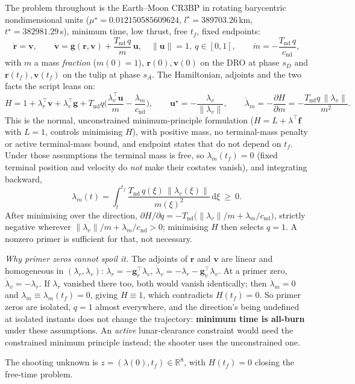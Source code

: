 \documentclass[11pt]{article}
\newcommand{\lv}{\lambda_v}\newcommand{\lr}{\lambda_r}\newcommand{\lm}{\lambda_m}
\newcommand{\tf}{t_f}\newcommand{\R}{\mathbb{R}}
\newcommand{\sD}{s_D}\newcommand{\sA}{s_A}
\newcommand{\Tnd}{T_{\mathrm{nd}}}\newcommand{\cnd}{c_{\mathrm{nd}}}
\begin{document}
\begin{rig}
The problem throughout is the Earth--Moon CR3BP in rotating barycentric
nondimensional units ($\mu^\star=0.012150585609624$, $l^\star=389703.26$\,km,
$t^\star=382981.29$\,s), minimum time, low thrust, free $\tf$, fixed endpoints:
\[
\dot{\bm r}=\bm v,\qquad
\dot{\bm v}=\bm g(\bm r,\bm v)+\frac{\Tnd\,q}{m}\,\bm u,\quad \|\bm u\|=1,\ q\in[0,1],\qquad
\dot m=-\frac{\Tnd\,q}{\cnd},
\]
with $m$ a mass \emph{fraction} ($m(0)=1$), $\bm r(0),\bm v(0)$ on the DRO at
phase $\sD$ and $\bm r(\tf),\bm v(\tf)$ on the tulip at phase $\sA$. The
Hamiltonian, adjoints and the two facts the script leans on:
\[
H=1+\lr^{\!\top}\bm v+\lv^{\!\top}\bm g+\Tnd q\Big(\frac{\lv^{\!\top}\bm u}{m}-\frac{\lm}{\cnd}\Big),
\qquad
\bm u^\star=-\frac{\lv}{\|\lv\|},
\qquad
\dot\lm=-\frac{\partial H}{\partial m}=-\frac{\Tnd q\,\|\lv\|}{m^2}.
\]
\label{sec:q1}This is the normal, unconstrained minimum-principle formulation ($H=L+\lambda^{\!\top}\bm f$
with $L=1$, controls minimising $H$), with positive mass, no terminal-mass
penalty or active terminal-mass bound, and endpoint states that do not
depend on $\tf$. Under those assumptions the terminal mass is free, so
$\lm(\tf)=0$ (fixed terminal position and velocity do \emph{not} make
their costates vanish), and integrating backward,
\[
\lm(t)=\int_t^{\tf}\frac{\Tnd\,q(\xi)\,\|\lv(\xi)\|}{m(\xi)^2}\,\mathrm d\xi\ \ge\ 0 .
\]
After minimising over the direction, $\partial H/\partial q=-\Tnd\big(\|\lv\|/m+\lm/\cnd\big)$,
strictly negative wherever $\|\lv\|/m+\lm/\cnd>0$; minimising $H$ then
selects $q=1$. A nonzero primer is sufficient for that, not necessary.

\emph{Why primer zeros cannot spoil it.} The adjoints of $\bm r$ and $\bm v$
are linear and homogeneous in $(\lr,\lv)$:
$\dot\lr=-\bm g_r^{\!\top}\lv$, $\dot\lv=-\lr-\bm g_v^{\!\top}\lv$. At a
primer zero, $\dot\lv=-\lr$. If $\lr$ vanished there too, both would
vanish identically; then $\dot\lm=0$ and $\lm\equiv\lm(\tf)=0$, giving
$H\equiv1$, which contradicts $H(\tf)=0$. So primer zeros are isolated,
$q=1$ almost everywhere, and the direction's being undefined at isolated
instants does not change the trajectory: \textbf{minimum time is all-burn}
under these assumptions. An \emph{active} lunar-clearance constraint would
need the constrained minimum principle instead; the shooter uses the
unconstrained one.

The shooting unknown is $z=(\lambda(0),\tf)\in\R^8$, with $H(\tf)=0$
closing the free-time problem.
\end{rig}
\end{document}
